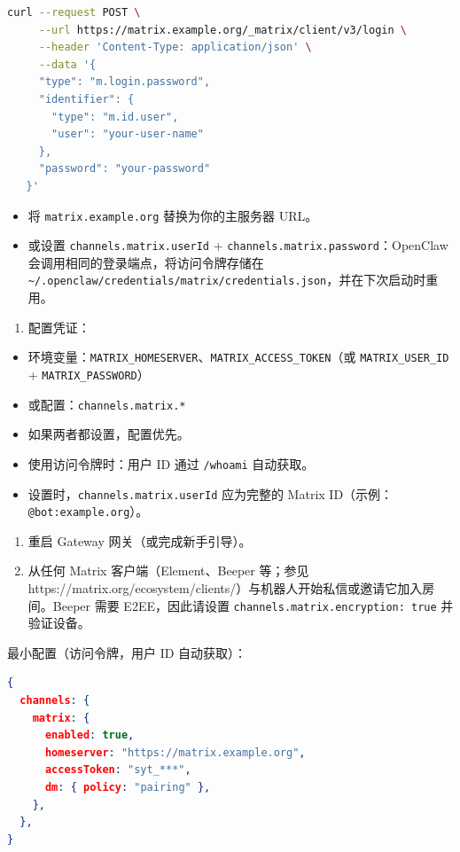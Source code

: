 \begin{lstlisting}[language=bash]
   curl --request POST \
     --url https://matrix.example.org/_matrix/client/v3/login \
     --header 'Content-Type: application/json' \
     --data '{
     "type": "m.login.password",
     "identifier": {
       "type": "m.id.user",
       "user": "your-user-name"
     },
     "password": "your-password"
   }'
\end{lstlisting}


\begin{itemize}
  \item 将 \texttt{matrix.example.org} 替换为你的主服务器 URL。
  \item 或设置 \texttt{channels.matrix.userId} + \texttt{channels.matrix.password}：OpenClaw 会调用相同的登录端点，将访问令牌存储在 \texttt{\textasciitilde{}/.openclaw/credentials/matrix/credentials.json}，并在下次启动时重用。
\end{itemize}


\begin{enumerate}
  \item 配置凭证：
\end{enumerate}

\begin{itemize}
  \item 环境变量：\texttt{MATRIX\_HOMESERVER}、\texttt{MATRIX\_ACCESS\_TOKEN}（或 \texttt{MATRIX\_USER\_ID} + \texttt{MATRIX\_PASSWORD}）
  \item 或配置：\texttt{channels.matrix.*}
  \item 如果两者都设置，配置优先。
  \item 使用访问令牌时：用户 ID 通过 \texttt{/whoami} 自动获取。
  \item 设置时，\texttt{channels.matrix.userId} 应为完整的 Matrix ID（示例：\texttt{@bot:example.org}）。
\end{itemize}

\begin{enumerate}
  \item 重启 Gateway 网关（或完成新手引导）。
  \item 从任何 Matrix 客户端（Element、Beeper 等；参见 https://matrix.org/ecosystem/clients/）与机器人开始私信或邀请它加入房间。Beeper 需要 E2EE，因此请设置 \texttt{channels.matrix.encryption: true} 并验证设备。
\end{enumerate}


最小配置（访问令牌，用户 ID 自动获取）：

\begin{lstlisting}[language=json]
{
  channels: {
    matrix: {
      enabled: true,
      homeserver: "https://matrix.example.org",
      accessToken: "syt_***",
      dm: { policy: "pairing" },
    },
  },
}
\end{lstlisting}



